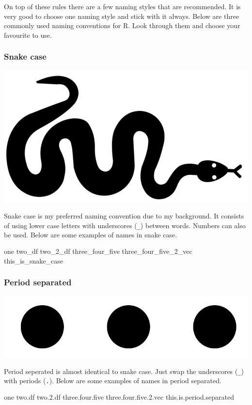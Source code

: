 \documentclass[]{book}
\newenvironment{Shaded}{\begin{snugshade}}{\end{snugshade}}
\newcommand{\FloatTok}[1]{\textcolor[rgb]{0.00,0.00,0.81}{#1}}
\newcommand{\NormalTok}[1]{#1}
\begin{document}
On top of these rules there are a few naming styles that are
recommended. It is very good to choose one naming style and stick with
it always. Below are three commonly used naming conventions for R. Look
through them and choose your favourite to use.

\subsubsection{Snake case}\label{snake-case}

\begin{center}\includegraphics[width=0.2\linewidth]{figures/snake_case} \end{center}

Snake case is my preferred naming convention due to my background. It
consists of using lower case letters with underscores (\texttt{\_})
between words. Numbers can also be used. Below are some examples of
names in snake case.

\begin{Shaded}
\begin{Highlighting}[]
\NormalTok{one}
\NormalTok{two_df}
\NormalTok{two_2_df}
\NormalTok{three_four_five}
\NormalTok{three_four_five_2_vec}
\NormalTok{this_is_snake_case}
\end{Highlighting}
\end{Shaded}

\subsubsection{Period separated}\label{period-separated}

\begin{center}\includegraphics[width=0.2\linewidth]{figures/period_separated} \end{center}

Period seperated is almost identical to snake case. Just swap the
underscores (\texttt{\_}) with periods (\texttt{.}). Below are some
examples of names in period separated.

\begin{Shaded}
\begin{Highlighting}[]
\NormalTok{one}
\NormalTok{two.df}
\NormalTok{two.}\FloatTok{2.}\NormalTok{df}
\NormalTok{three.four.five}
\NormalTok{three.four.five.}\FloatTok{2.}\NormalTok{vec}
\NormalTok{this.is.period.separated}
\end{Highlighting}
\end{Shaded}
\end{document}
